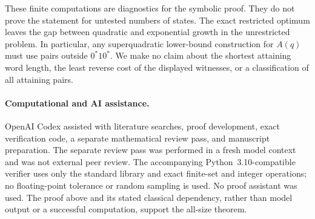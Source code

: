 \documentclass[11pt,a4paper]{article}
\begin{document}
These finite computations are diagnostics for the symbolic proof.
They do not prove the statement for untested numbers of states.
The exact restricted optimum leaves the gap between quadratic and
exponential growth in the unrestricted problem. In particular,
any superquadratic lower-bound construction for \(A(q)\) must use
pairs outside \(0^*10^*\). We make no claim about the shortest attaining
word length, the least reverse cost of the displayed witnesses,
or a classification of all attaining pairs.

\paragraph{Computational and AI assistance.}
OpenAI Codex assisted with literature searches, proof development,
exact verification code, a separate mathematical review pass, and
manuscript preparation. The separate review pass was performed in a
fresh model context and was not external peer review.
The accompanying Python~3.10-compatible verifier uses only the standard
library and exact finite-set and integer operations; no floating-point
tolerance or random sampling is used.
No proof assistant was used. The proof above and its stated classical
dependency, rather than model output or a successful computation,
support the all-size theorem.



\end{document}
